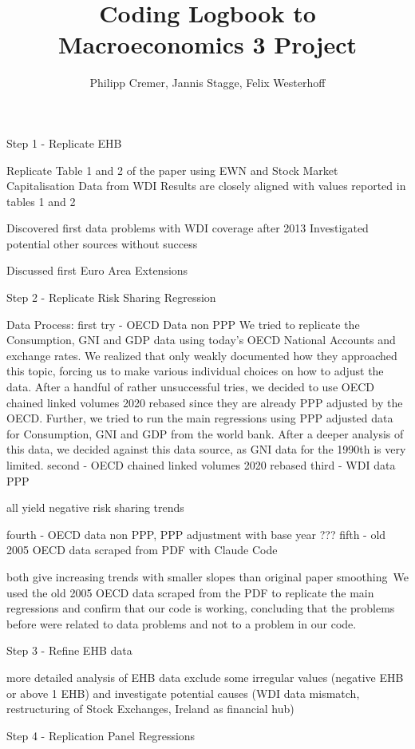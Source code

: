 \documentclass{article}
\title{Coding Logbook to Macroeconomics 3 Project}
\author{Philipp Cremer, Jannis Stagge, Felix Westerhoff}
\begin{document}
\maketitle

Step 1 - Replicate EHB

Replicate Table 1 and 2 of the paper using EWN and Stock Market Capitalisation Data from WDI
Results are closely aligned with values reported in tables 1 and 2

Discovered first data problems with WDI coverage after 2013
Investigated potential other sources without success

Discussed first Euro Area Extensions

Step 2 - Replicate Risk Sharing Regression

Data Process:
first try - OECD Data non PPP 
We tried to replicate the Consumption, GNI and GDP data using today's OECD National Accounts and exchange rates. 
We realized that \textcite{main} only weakly documented how they approached this topic, forcing us to make various 
individual choices on how to adjust the data. After a handful of rather unsuccessful tries, we decided to use OECD chained linked
volumes 2020 rebased since they are already PPP adjusted by the OECD.
Further, we tried to run the main regressions using PPP adjusted data for Consumption, GNI and GDP from the world bank. 
After a deeper analysis of this data, we decided against this data source, as GNI data for the 1990th is very limited. 
second - OECD chained linked volumes 2020 rebased
third - WDI data PPP

all yield negative risk sharing trends

fourth - OECD data non PPP, PPP adjustment with base year ???
fifth - old 2005 OECD data scraped from PDF with Claude Code

both give increasing trends with smaller slopes than original paper
smoothing\
We used the old 2005 OECD data scraped from the PDF to replicate the main regressions and confirm that our code is 
working, concluding that the problems before were related to data problems and not to a problem in our code. 


Step 3 - Refine EHB data

more detailed analysis of EHB data
exclude some irregular values (negative EHB or above 1 EHB) and investigate potential causes (WDI data mismatch, restructuring of Stock Exchanges, Ireland as financial hub)

Step 4 - Replication Panel Regressions
\end{document}
